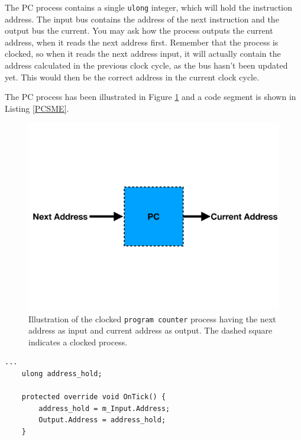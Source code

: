         The PC process contains a single \texttt{ulong} integer, which will hold the instruction address. The input bus contains the address of the next instruction and the output bus the current. You may ask how the process outputs the current address, when it reads the next address first. Remember that the process is clocked, so when it reads the next address input, it will actually contain the address calculated in the previous clock cycle, as the bus hasn't been updated yet. This would then be the correct address in the current clock cycle.
        
        The PC process has been illustrated in Figure \ref{fig:PC} and a code segment is shown in Listing \ref{PCSME}. 
        
        
        
        \begin{figure}[h!]
            \centering
            \includegraphics[scale=0.2]{pictures/PC.pdf}
            \caption{Illustration of the clocked \texttt{program counter} process having the next address as input and current address as output. The dashed square indicates a clocked process.}
            \label{fig:PC}
        \end{figure}
    
        \begin{minipage}{\linewidth}
            \begin{lstlisting}[language={[Sharp]C}, caption={A slice of the PC unit SME code, which contains a variable that holds the input address. On every cycle edge it then holds and outputs the current address.},captionpos=b, label = PCSME]
...
    ulong address_hold;

    protected override void OnTick() {
        address_hold = m_Input.Address;
        Output.Address = address_hold;
    }
            \end{lstlisting}
        \end{minipage}   
    
